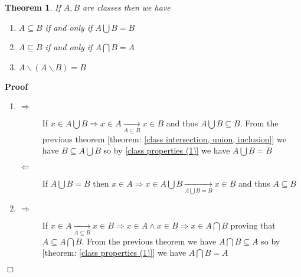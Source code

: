 \documentclass{book}
\newcommand{\Rightarrowlim}{\mathop{\rightarrow}\limits}
\newenvironment{proof}{\noindent\textbf{Proof\ }}{\hspace*{\fill}$\Box$\medskip}
\newtheorem{theorem}{Theorem}
\begin{document}
\begin{theorem}
  \label{class inclusion and union and intersection}If $A, B$ are classes then
  we have
  \begin{enumerate}
    \item $A \subseteq B$ if and only if $A \bigcup B = B$
    
    \item $A \subseteq B$ if and only if $A \bigcap B = A$
    
    \item $A\backslash (A\backslash B) = B$
  \end{enumerate}
\end{theorem}

\begin{proof}
  
  \begin{enumerate}
    \item
    \begin{description}
      \item[$\Rightarrow$] If $x \in A \bigcup B \Rightarrow x \in A
      \Rightarrowlim_{A \subseteq B} x \in B$ and thus $A \bigcup B \subseteq
      B$. From the previous theorem [theorem: \ref{class intersection, union,
      inclusion}] we have $B \subseteq A \bigcup B$ so by \ref{class
      properties (1)} we have $A \bigcup B = B$
      
      \item[$\Leftarrow$] If $A \bigcup B = B$ then $x \in A \Rightarrow x \in
      A \bigcup B \Rightarrowlim_{A \bigcup B = B} x \in B$ and thus $A
      \subseteq B$
    \end{description}
    \item
    \begin{description}
      \item[$\Rightarrow$] If $x \in A \Rightarrowlim_{A \subseteq B} x \in B
      \Rightarrow x \in A \wedge x \in B \Rightarrow x \in A \bigcap B$
      proving that $A \subseteq A \bigcap B$. From the previous theorem we
      have $A \bigcap B \subseteq A$ so by [theorem: \ref{class properties
      (1)}] we have $A \bigcap B = A$
      

\end{description}
\end{enumerate}
\end{proof}
\end{document}
